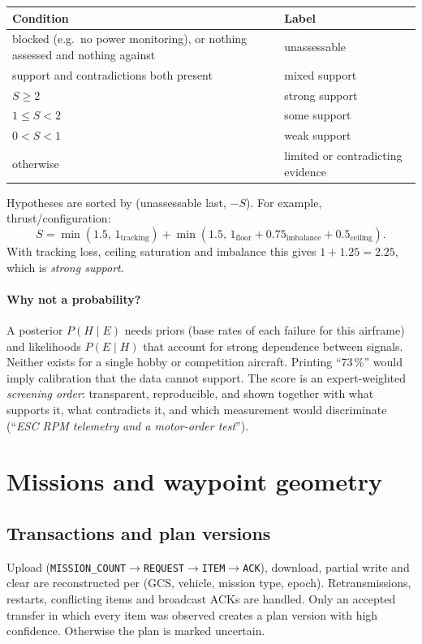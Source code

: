 \documentclass[11pt,a4paper]{article}
\newcommand{\code}[1]{\texttt{#1}}
\begin{document}
\begin{center}
\begin{tabularx}{\linewidth}{@{}Xl@{}}
\toprule
Condition & Label \\
\midrule
blocked (e.g.\ no power monitoring), or nothing assessed and nothing against & unassessable \\
support and contradictions both present & mixed support \\
$S\ge2$ & strong support \\
$1\le S<2$ & some support \\
$0<S<1$ & weak support \\
otherwise & limited or contradicting evidence \\
\bottomrule
\end{tabularx}
\end{center}

Hypotheses are sorted by (unassessable last, $-S$). For example, thrust/configuration:
\[
S=\min(1.5,\,1_{\text{tracking}})+\min(1.5,\,1_{\text{floor}}+0.75_{\text{imbalance}}+0.5_{\text{ceiling}}).
\]
With tracking loss, ceiling saturation and imbalance this gives $1+1.25=2.25$, which is
\emph{strong support}.

\paragraph{Why not a probability?} A posterior $P(H\mid E)$ needs priors (base rates of each failure
for this airframe) and likelihoods $P(E\mid H)$ that account for strong dependence between
signals. Neither exists for a single hobby or competition aircraft. Printing ``73\,\%'' would imply
calibration that the data cannot support. The score is an expert-weighted \emph{screening order}:
transparent, reproducible, and shown together with what supports it, what contradicts it, and
which measurement would discriminate (``\emph{ESC RPM telemetry and a motor-order test}'').

\section{Missions and waypoint geometry}

\subsection{Transactions and plan versions}
Upload (\code{MISSION\_COUNT}$\to$\code{REQUEST}$\to$\code{ITEM}$\to$\code{ACK}), download, partial
write and clear are reconstructed per (GCS, vehicle, mission type, epoch). Retransmissions,
restarts, conflicting items and broadcast ACKs are handled. Only an accepted transfer in which every
item was observed creates a plan version with high confidence. Otherwise the plan is marked
uncertain.
\end{document}
